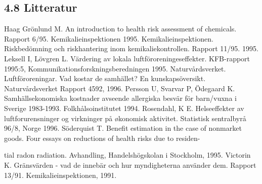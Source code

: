 \subsection*{4.8 Litteratur}
Haag Grönlund M. An introduction to health risk assessment of chemicals. Rapport 6/95. Kemikalieinspektionen 1995.
Kemikalieinspektionen. Riskbedömning och riskhantering inom kemikaliekontrollen. Rapport 11/95. 1995.
Leksell I, Lövgren L. Värdering av lokala luftföroreningeseffekter. KFB-rapport 1995:5, Kommunikationsforskningsberedningen 1995.
Naturvårdsverket. Luftföroreningar. Vad kostar de samhället? En kunskapsöversikt. Naturvårdsverket Rapport 4592, 1996.
Persson U, Svarvar P, Ödegaard K. Samhällsekonomiska kostnader avseende allergiska besvär för barn/vuxna i Sverige 1983-1993. Folkhålsoinstitutet 1994.
Rosendahl, K E. Helseeffekter av luftforurensninger og virkninger på økonomisk aktivitet. Statistisk sentralbyrå 96/8, Norge 1996.
Söderquist T. Benefit estimation in the case of nonmarket goods. Four essays on reductions of health risks due to residen-

tial radon radiation. Avhandling, Handelshögskolan i Stockholm, 1995.
Victorin K. Gränsvärden - vad de innebär och hur myndigheterna använder dem. Rapport 13/91. Kemikalieinspektionen, 1991.